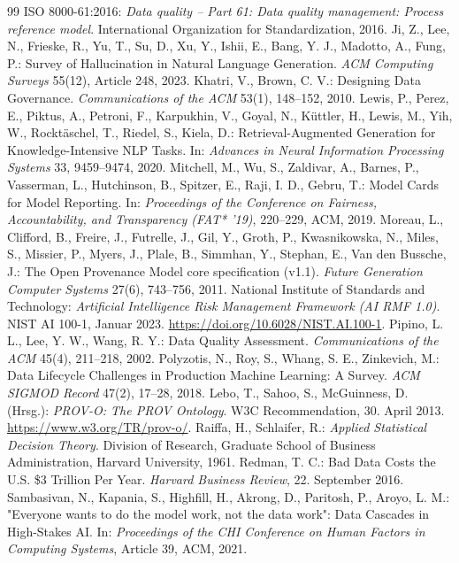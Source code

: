 \documentclass[a4paper,12pt]{article}
\theoremstyle{definition}
\begin{document}
\begin{thebibliography}{99}
 ISO 8000-61:2016: \emph{Data quality -- Part 61: Data quality management: Process reference model}. International Organization for Standardization, 2016.
 Ji, Z., Lee, N., Frieske, R., Yu, T., Su, D., Xu, Y., Ishii, E., Bang, Y. J., Madotto, A., Fung, P.: Survey of Hallucination in Natural Language Generation. \emph{ACM Computing Surveys} 55(12), Article 248, 2023.
 Khatri, V., Brown, C. V.: Designing Data Governance. \emph{Communications of the ACM} 53(1), 148--152, 2010.
 Lewis, P., Perez, E., Piktus, A., Petroni, F., Karpukhin, V., Goyal, N., Küttler, H., Lewis, M., Yih, W., Rocktäschel, T., Riedel, S., Kiela, D.: Retrieval-Augmented Generation for Knowledge-Intensive NLP Tasks. In: \emph{Advances in Neural Information Processing Systems} 33, 9459--9474, 2020.
 Mitchell, M., Wu, S., Zaldivar, A., Barnes, P., Vasserman, L., Hutchinson, B., Spitzer, E., Raji, I. D., Gebru, T.: Model Cards for Model Reporting. In: \emph{Proceedings of the Conference on Fairness, Accountability, and Transparency (FAT* '19)}, 220--229, ACM, 2019.
 Moreau, L., Clifford, B., Freire, J., Futrelle, J., Gil, Y., Groth, P., Kwasnikowska, N., Miles, S., Missier, P., Myers, J., Plale, B., Simmhan, Y., Stephan, E., Van den Bussche, J.: The Open Provenance Model core specification (v1.1). \emph{Future Generation Computer Systems} 27(6), 743--756, 2011.
 National Institute of Standards and Technology: \emph{Artificial Intelligence Risk Management Framework (AI RMF 1.0)}. NIST AI 100-1, Januar 2023. \url{https://doi.org/10.6028/NIST.AI.100-1}.
 Pipino, L. L., Lee, Y. W., Wang, R. Y.: Data Quality Assessment. \emph{Communications of the ACM} 45(4), 211--218, 2002.
 Polyzotis, N., Roy, S., Whang, S. E., Zinkevich, M.: Data Lifecycle Challenges in Production Machine Learning: A Survey. \emph{ACM SIGMOD Record} 47(2), 17--28, 2018.
 Lebo, T., Sahoo, S., McGuinness, D. (Hrsg.): \emph{PROV-O: The PROV Ontology}. W3C Recommendation, 30. April 2013. \url{https://www.w3.org/TR/prov-o/}.
 Raiffa, H., Schlaifer, R.: \emph{Applied Statistical Decision Theory}. Division of Research, Graduate School of Business Administration, Harvard University, 1961.
 Redman, T. C.: Bad Data Costs the U.S. \$3 Trillion Per Year. \emph{Harvard Business Review}, 22. September 2016.
 Sambasivan, N., Kapania, S., Highfill, H., Akrong, D., Paritosh, P., Aroyo, L. M.: "Everyone wants to do the model work, not the data work": Data Cascades in High-Stakes AI. In: \emph{Proceedings of the CHI Conference on Human Factors in Computing Systems}, Article 39, ACM, 2021.

\end{thebibliography}
\end{document}
